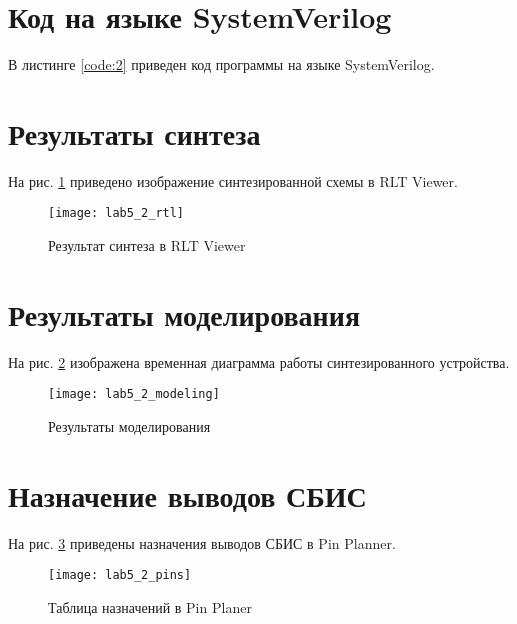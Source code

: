 \section{Код на языке SystemVerilog}

В листинге \ref{code:2} приведен код программы на языке SystemVerilog.


\vspace{-0.5cm}

\section{Результаты синтеза}

На рис. \ref{fig:lab5_2_rtl} приведено изображение синтезированной схемы в RLT Viewer.

\begin{figure}[H]
\begin{center}
	\texttt{[image: lab5\_2\_rtl]}
	\caption{Результат синтеза в RLT Viewer}
	\label{fig:lab5_2_rtl}
\end{center}
\end{figure}

\newpage

\section{Результаты моделирования}
\label{sec:lab5_2_modeling}

На рис. \ref{fig:lab5_2_modeling} изображена временная диаграмма работы синтезированного устройства.

\begin{figure}[H]
\begin{center}
	\texttt{[image: lab5\_2\_modeling]}
	\caption{Результаты моделирования}
	\label{fig:lab5_2_modeling}
\end{center}
\end{figure}

\section{Назначение выводов СБИС}

На рис. \ref{fig:lab5_2_pins} приведены назначения выводов СБИС в Pin Planner.

\begin{figure}[H]
\begin{center}
	\texttt{[image: lab5\_2\_pins]}
	\caption{Таблица назначений в Pin Planer}
	\label{fig:lab5_2_pins}
\end{center}
\end{figure}

